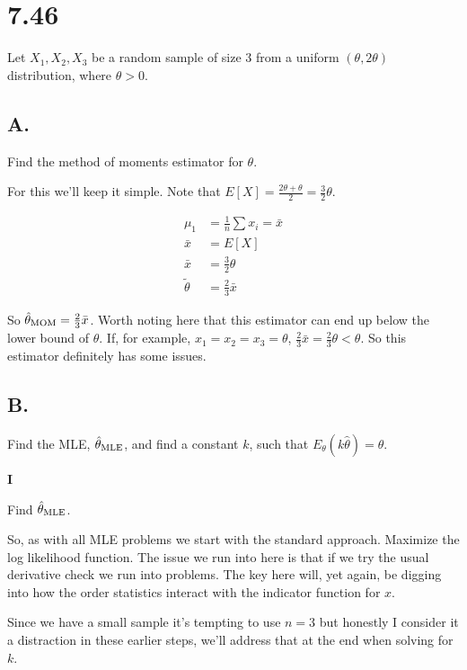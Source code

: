 \section*{7.46}

Let $X_1, X_2, X_3$ be a random sample of size 3 from a uniform $(\theta, 2\theta)$ distribution, where $\theta > 0$.

\subsection*{A.}

Find the method of moments estimator for $\theta$.

For this we'll keep it simple. Note that $E[X] = \frac{2\theta + \theta}{2} = \frac{3}{2} \theta$. 

\begin{align*}
	\mu_1 &= \frac{1}{n} \sum x_i = \bar{x} \\
	\bar{x} &= E[X] \\
	\bar{x} &= \frac{3}{2} \theta \\
	\tilde{\theta} &= \frac{2}{3} \bar{x}
\end{align*}

So $\hat{\theta}_{\text{MOM}} = \frac{2}{3} \bar{x}$. Worth noting here that this estimator can end up below the lower bound of $\theta$. If, for example, $x_1=x_2=x_3=\theta$, $\frac{2}{3} \bar{x} = \frac{2}{3} \theta < \theta$. So this estimator definitely has some issues. 

\subsection*{B.}

\noindent Find the MLE, $\hat{\theta}_{\text{MLE}}$, and find a constant $k$, such that $E_{\theta}(k\hat{\theta}) = \theta$.

\noindent\textbf{I}

Find $\hat{\theta}_{\text{MLE}}$.

So, as with all MLE problems we start with the standard approach. Maximize the log likelihood function. The issue we run into here is that if we try the usual derivative check we run into problems. The key here will, yet again, be digging into how the order statistics interact with the indicator function for $x$.

Since we have a small sample it's tempting to use $n=3$ but honestly I consider it a distraction in these earlier steps, we'll address that at the end when solving for $k$. 

